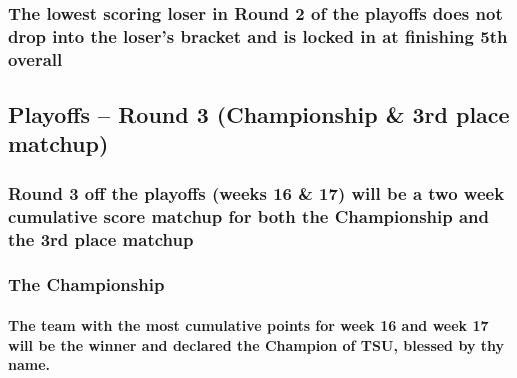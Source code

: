 \documentclass[
]{book}
\begin{document}
\hypertarget{the-lowest-scoring-loser-in-round-2-of-the-playoffs-does-not-drop-into-the-losers-bracket-and-is-locked-in-at-finishing-5th-overall}{%
\subsubsection{The lowest scoring loser in Round 2 of the playoffs does not drop into the loser's bracket and is locked in at finishing 5th overall}\label{the-lowest-scoring-loser-in-round-2-of-the-playoffs-does-not-drop-into-the-losers-bracket-and-is-locked-in-at-finishing-5th-overall}}

\hypertarget{playoffs-round-3-championship-3rd-place-matchup}{%
\subsection{Playoffs -- Round 3 (Championship \& 3rd place matchup)}\label{playoffs-round-3-championship-3rd-place-matchup}}

\hypertarget{round-3-off-the-playoffs-weeks-16-17-will-be-a-two-week-cumulative-score-matchup-for-both-the-championship-and-the-3rd-place-matchup}{%
\subsubsection{Round 3 off the playoffs (weeks 16 \& 17) will be a two week cumulative score matchup for both the Championship and the 3rd place matchup}\label{round-3-off-the-playoffs-weeks-16-17-will-be-a-two-week-cumulative-score-matchup-for-both-the-championship-and-the-3rd-place-matchup}}

\hypertarget{the-championship}{%
\subsubsection{The Championship}\label{the-championship}}

\hypertarget{the-team-with-the-most-cumulative-points-for-week-16-and-week-17-will-be-the-winner-and-declared-the-champion-of-tsu-blessed-by-thy-name.}{%
\paragraph{The team with the most cumulative points for week 16 and week 17 will be the winner and declared the Champion of TSU, blessed by thy name.}\label{the-team-with-the-most-cumulative-points-for-week-16-and-week-17-will-be-the-winner-and-declared-the-champion-of-tsu-blessed-by-thy-name.}}
\end{document}
